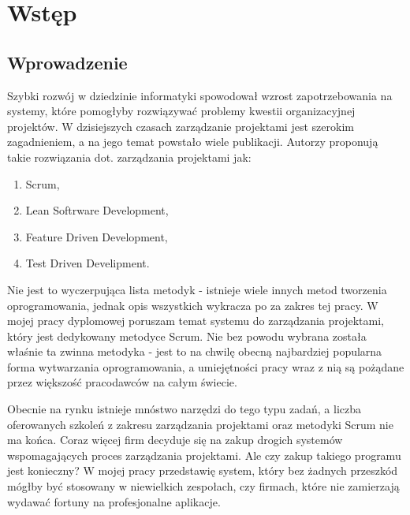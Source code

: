 \chapter{Wstęp}
\section{Wprowadzenie}

Szybki rozwój w dziedzinie informatyki spowodował wzrost zapotrzebowania na systemy, które pomogłyby rozwiązywać problemy kwestii organizacyjnej projektów. W dzisiejszych czasach zarządzanie projektami jest szerokim zagadnieniem, a na jego temat powstało wiele publikacji. Autorzy proponują takie rozwiązania dot. zarządzania projektami jak:
\begin{enumerate}
	\item Scrum,
	\item Lean Softrware Development,
	\item Feature Driven Development,
	\item Test Driven Develipment.
\end{enumerate}

Nie jest to wyczerpująca lista metodyk - istnieje wiele innych metod tworzenia oprogramowania, jednak opis wszystkich wykracza po za zakres tej pracy. W mojej pracy dyplomowej poruszam temat systemu do zarządzania projektami, który jest dedykowany metodyce Scrum. Nie bez powodu wybrana została właśnie ta zwinna metodyka - jest to na chwilę obecną najbardziej popularna forma wytwarzania oprogramowania, a umiejętności pracy wraz z nią są pożądane przez większość pracodawców na całym świecie.

Obecnie na rynku istnieje mnóstwo narzędzi do tego typu zadań, a liczba oferowanych szkoleń z zakresu zarządzania projektami oraz metodyki Scrum nie ma końca. Coraz więcej firm decyduje się na zakup drogich systemów wspomagających proces zarządzania projektami. Ale czy zakup takiego programu jest konieczny? W mojej pracy przedstawię system, który bez żadnych przeszkód mógłby być stosowany w niewielkich zespołach, czy firmach, które nie zamierzają wydawać fortuny na profesjonalne aplikacje.

